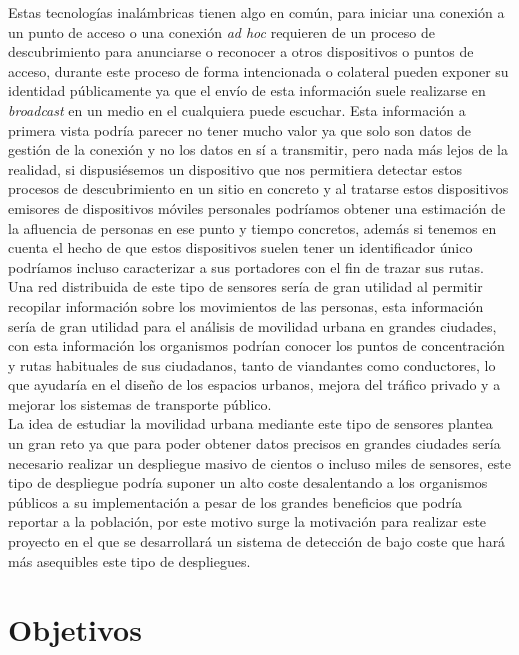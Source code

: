 \documentclass[../proyecto.tex]{subfiles}
\begin{document}
Estas tecnologías inalámbricas tienen algo en común, para iniciar una conexión a un punto de acceso o una conexión \textit{ad hoc} requieren de un proceso de descubrimiento para anunciarse o reconocer a otros dispositivos o puntos de acceso, durante este proceso de forma intencionada o colateral pueden exponer su identidad públicamente ya que el envío de esta información suele realizarse en \textit{broadcast} en un medio en el cualquiera puede escuchar. Esta información a primera vista podría parecer no tener mucho valor ya que solo son datos de gestión de la conexión y no los datos en sí a transmitir, pero nada más lejos de la realidad, si dispusiésemos un dispositivo que nos permitiera detectar estos procesos de descubrimiento en un sitio en concreto y al tratarse estos dispositivos emisores de dispositivos móviles personales podríamos obtener una estimación de la afluencia de personas en ese punto y tiempo concretos, además si tenemos en cuenta el hecho de que estos dispositivos suelen tener un identificador único podríamos incluso caracterizar a sus portadores con el fin de trazar sus rutas.\\

Una red distribuida de este tipo de sensores sería de gran utilidad al permitir recopilar información sobre los movimientos de las personas, esta información sería de gran utilidad para el análisis de movilidad urbana en grandes ciudades, con esta información los organismos podrían conocer los puntos de concentración y rutas habituales de sus ciudadanos, tanto de viandantes como conductores, lo que ayudaría en el diseño de los espacios urbanos, mejora del tráfico privado y a mejorar los sistemas de transporte público.\\

La idea de estudiar la movilidad urbana mediante este tipo de sensores plantea un gran reto ya que para poder obtener datos precisos en grandes ciudades sería necesario realizar un despliegue masivo de cientos o incluso miles de sensores, este tipo de despliegue podría suponer un alto coste desalentando a los organismos públicos a su implementación a pesar de los grandes beneficios que podría reportar a la población, por este motivo surge la motivación para realizar este proyecto en el que se desarrollará un sistema de detección de bajo coste que hará más asequibles este tipo de despliegues.\\

\section{Objetivos}
\end{document}
